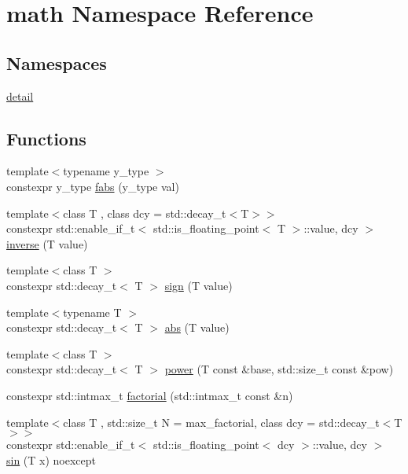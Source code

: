 \hypertarget{namespacemath}{}\section{math Namespace Reference}
\label{namespacemath}
\subsection*{Namespaces}
\begin{DoxyCompactItemize}
\item 
 \hyperlink{namespacemath_1_1detail}{detail}
\end{DoxyCompactItemize}
\subsection*{Functions}
\begin{DoxyCompactItemize}
\item 
{\footnotesize template$<$typename y\+\_\+type $>$ }\\constexpr y\+\_\+type \hyperlink{namespacemath_a4ed3724aa337c68adee88563238c6845}{fabs} (y\+\_\+type val)
\item 
{\footnotesize template$<$class T , class dcy  = std\+::decay\+\_\+t$<$\+T$>$$>$ }\\constexpr std\+::enable\+\_\+if\+\_\+t$<$ std\+::is\+\_\+floating\+\_\+point$<$ T $>$\+::value, dcy $>$ \hyperlink{namespacemath_ad1f27e28f460fb7a1393d9c0518c2e53}{inverse} (T value)
\item 
{\footnotesize template$<$class T $>$ }\\constexpr std\+::decay\+\_\+t$<$ T $>$ \hyperlink{namespacemath_a9fed6bdc392a6c857d3d1a93f735e243}{sign} (T value)
\item 
{\footnotesize template$<$typename T $>$ }\\constexpr std\+::decay\+\_\+t$<$ T $>$ \hyperlink{namespacemath_a49650a9f506dd5208d963d74ab9b9370}{abs} (T value)
\item 
{\footnotesize template$<$class T $>$ }\\constexpr std\+::decay\+\_\+t$<$ T $>$ \hyperlink{namespacemath_a096802f59879957bb79b461ee9a0ddf9}{power} (T const \&base, std\+::size\+\_\+t const \&pow)
\item 
constexpr std\+::intmax\+\_\+t \hyperlink{namespacemath_a7606ea45ee84c24d1a0e661bec3879f1}{factorial} (std\+::intmax\+\_\+t const \&n)
\item 
{\footnotesize template$<$class T , std\+::size\+\_\+t N = max\+\_\+factorial, class dcy  = std\+::decay\+\_\+t$<$\+T$>$$>$ }\\constexpr std\+::enable\+\_\+if\+\_\+t$<$ std\+::is\+\_\+floating\+\_\+point$<$ dcy $>$\+::value, dcy $>$ \hyperlink{namespacemath_a82b6cd9ca916160f03a5d1450eb7a009}{sin} (T x) noexcept
\end{DoxyCompactItemize}


